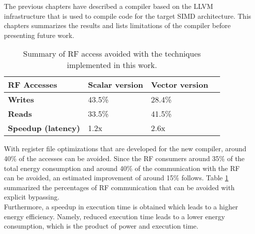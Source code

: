 The previous chapters have described a compiler based on the LLVM infrastructure that is used to compile code for the target SIMD architecture. This chapters summarizes the results and lists limitations of the compiler before presenting future work.

\begin{table}[H]
\caption{Summary of RF access avoided with the techniques implemented in this work.}
\begin{center}
\begin{tabular}{@{}l l l l@{}}
\toprule
\textbf{RF Accesses}	& \textbf{Scalar version}	& \textbf{Vector version}\\\hline
\textbf{Writes}		& 43.5\%				& 28.4\%		\\
\textbf{Reads}		& 33.5\%				& 41.5\%		\\
\bottomrule
\textbf{Speedup (latency)}	& 1.2x			& 2.6x		\\
\end{tabular}
\end{center}
\label{table:evaluation_results}
\end{table}%

%
With register file optimizations that are developed for the new compiler, around 40\% of the accesses can be avoided. Since the RF consumers around 35\% of the total energy consumption and around 40\% of the communication with the RF can be avoided, an estimated improvement of around 15\% follows. Table \ref{table:evaluation_results} summarized the percentages of RF communication that can be avoided with explicit bypassing.\\

Furthermore, a speedup in execution time is obtained which leads to a higher energy efficiency. Namely, reduced execution time leads to a lower energy consumption, which is the product of power and execution time.



